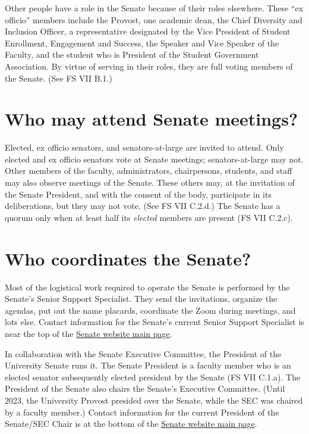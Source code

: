 \documentclass[12pt]{article}
\begin{document}
Other people have a role in the Senate because of their roles elsewhere.
These ``ex officio'' members include the Provost, one academic dean, the
Chief Diversity and Inclusion Officer, a representative designated by
the Vice President of Student Enrollment, Engagement and Success, the
Speaker and Vice Speaker of the Faculty, and the student who is
President of the Student Government Association. By virtue of serving in
their roles, they are full voting members of the Senate. (See FS VII
B.1.)

\section{Who may attend Senate
meetings?}\label{who-may-attend-senate-meetings}

Elected, ex officio senators, and senators-at-large are invited to
attend. Only elected and ex officio senators vote at Senate meetings;
senators-at-large may not. Other members of the faculty, administrators,
chairpersons, students, and staff may also observe meetings of the
Senate. These others may, at the invitation of the Senate President, and
with the consent of the body, participate in its deliberations, but they
may not vote. (See FS VII C.2.d.) The Senate has a quorum only when at
least half its \emph{elected} members are present (FS VII C.2.c).

\section{Who coordinates the Senate?}\label{who-coordinates-the-senate}

Most of the logistical work required to operate the Senate is performed
by the Senate's Senior Support Specialist. They send the invitations,
organize the agendas, put out the name placards, coordinate the Zoom
during meetings, and lots else. Contact information for the Senate's
current Senior Support Specialist is near the top of the
\href{https://www.hofstra.edu/senate/}{Senate website main page}.

In collaboration with the Senate Executive Committee, the President of
the University Senate runs it. The Senate President is a faculty member
who is an elected senator subsequently elected president by the Senate
(FS VII C.1.a). The President of the Senate also chairs the Senate's
Executive Committee. (Until 2023, the University Provost presided over
the Senate, while the SEC was chaired by a faculty member.) Contact
information for the current President of the Senate/SEC Chair is at the
bottom of the \href{https://www.hofstra.edu/senate/}{Senate website main
page}.
\end{document}
